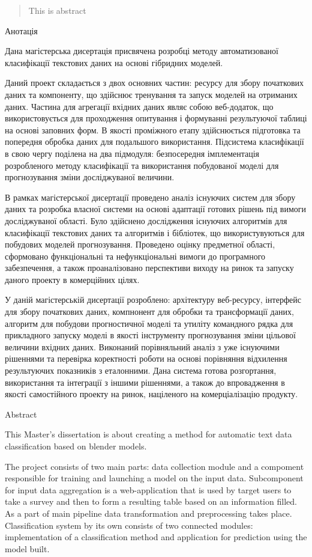 \begin{abstract}
This is abstract
\end{abstract}

Анотація

Дана магістерська дисертація присвячена розробці методу автоматизованої класифікації текстових даних на основі гібридних моделей. 

Даний проект складається з двох основних частин: ресурсу для збору початкових даних та компоненту, що здійснює тренування та запуск моделей на отриманих даних. Частина для агрегації вхідних даних являє собою веб-додаток, що використовується для проходження опитування і формуванні результуючої таблиці на основі заповних форм. В якості проміжного етапу здійснюється підготовка та попередня обробка даних для подальшого використання. Підсистема класифікації в свою чергу поділена на два підмодуля: безпосередня імплементація розробленого методу класифікації та використання побудованої моделі для прогнозування зміни досліджуваної величини.

В рамках магістерської дисертації проведено аналіз існуючих систем для збору даних та розробка власної системи на основі адаптації готових рішень під вимоги досліджуваної області. Було здійснено дослідження існуючих алгоритмів для класифікації текстових даних та алгоритмів і бібліотек, що використувуються для побудових моделей прогнозування. Проведено оцінку предметної області, сформовано функціональні та нефункціональні вимоги до програмного забезпечення, а також проаналізовано перспективи виходу на ринок та запуску даного проекту в комерційних цілях.

У даній магістерській дисертації розроблено: архітектуру веб-ресурсу, інтерфейс для збору початкових даних, компнонент для обробки та трансформації даних, алгоритм для побудови прогностичної моделі та утиліту командного рядка для прикладного запуску моделі в якості інструменту прогнозування зміни цільової величини вхідних даних. Виконаний порівняльний аналіз з уже існуючими рішеннями та перевірка коректності роботи на основі порівняння відхилення результуючих показників з еталонними. Дана система готова розгортання, використання та інтеграції з іншими рішеннями, а також до впровадження в якості самостійного проекту на ринок, націленого на комерціалізацію продукту.


Abstract

This Master's dissertation is about creating a method for automatic text data classification based on blender models.

The project consists of two main parts: data collection module and a compoment responsible for training and launching a model on the input data. Subcomponent for input data aggregation is a web-application that is used by target users to take a survey and then to form a resulting table based on an information filled. As a part of main pipeline data transformation and preprocessing takes place. Classification system by its own consists of two connected modules: implementation of a classification method and application for prediction using the model built.

